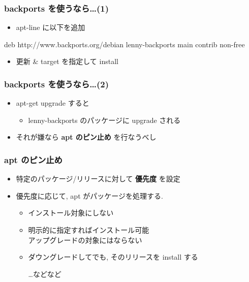 \documentclass[cjk,dvipdfmx,12pt,%
hyperref={bookmarks=true,bookmarksnumbered=true,bookmarksopen=false,%
colorlinks=false,%
pdftitle={野良ビルドから始めるパッケージ作成},%
pdfauthor={佐々木洋平},%
pdfsubject={第37回関西Debian勉強会 at OSC 2010 Kansai$@$kyoto},%
}]{beamer}
\begin{document}
\begin{frame}[fragile]
\frametitle{backports を使うなら\dots{}(1)}

\begin{itemize}
\item apt-line に以下を追加
\end{itemize}

\begin{commandline}
deb http://www.backports.org/debian lenny-backports main contrib non-free
\end{commandline}

\begin{itemize}
\item 更新 \& target を指定して install
\end{itemize}

\begin{commandline}
\end{commandline}


\end{frame}

\begin{frame}[fragile]
\frametitle{backports を使うなら\dots{}(2)}


\begin{itemize}
\item apt-get upgrade すると

\begin{itemize}
\item lenny-backports のパッケージに upgrade される
\end{itemize}
\item それが嫌なら \textbf{apt のピン止め} を行なうべし
\end{itemize}


\end{frame}





\begin{frame}[fragile]
\frametitle{apt のピン止め}


\begin{itemize}
\item 特定のパッケージ/リリースに対して \textbf{優先度} を設定
\item 優先度に応じて, apt がパッケージを処理する.

\begin{itemize}
\item インストール対象にしない
\item 明示的に指定すればインストール可能\\
アップグレードの対象にはならない
\item ダウングレードしてでも, そのリリースを install する
\begin{center}
\dots{}などなど
\end{center}
\end{itemize}
\end{itemize}


\end{frame}
\end{document}
